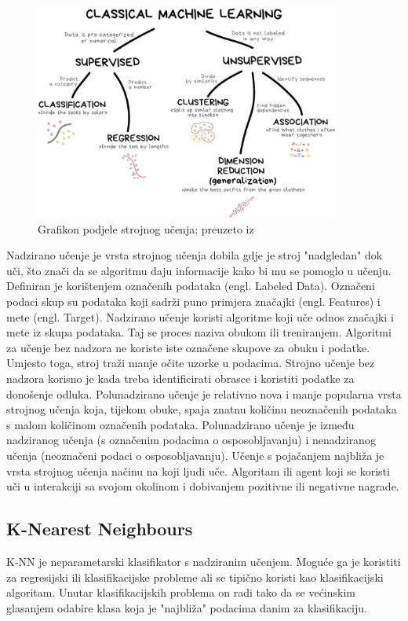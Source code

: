 \documentclass[]{foi}
\begin{document}
\begin{figure}[!h]
    \centering
    \includegraphics[width=0.9\textwidth]{slike/machine.jpg}
    \caption{Grafikon podjele strojnog učenja; preuzeto iz \cite{Machine}}
    \label{fig:machine-graf}
\end{figure}

Nadzirano učenje je vrsta strojnog učenja dobila gdje je stroj "nadgledan" dok uči, što znači da se algoritmu daju informacije kako bi mu se pomoglo u učenju. Definiran je korištenjem označenih podataka (engl. Labeled Data). Označeni podaci skup su podataka koji sadrži puno primjera značajki (engl. Features) i mete (engl. Target). Nadzirano učenje koristi algoritme koji uče odnos značajki i mete iz skupa podataka. Taj se proces naziva obukom ili treniranjem. \cite{Coursera2023}
Algoritmi za učenje bez nadzora ne koriste iste označene skupove za obuku i podatke. Umjesto toga, stroj traži manje očite uzorke u podacima. Strojno učenje bez nadzora korisno je kada treba identificirati obrasce i koristiti podatke za donošenje odluka. \cite{Coursera2023}
Polunadzirano učenje je relativno nova i manje popularna vrsta strojnog učenja koja, tijekom obuke, spaja znatnu količinu neoznačenih podataka s malom količinom označenih podataka. Polunadzirano učenje je između nadziranog učenja (s označenim podacima o osposobljavanju) i nenadziranog učenja (neoznačeni podaci o osposobljavanju). \cite{Datacamp}
Učenje s pojačanjem najbliža je vrsta strojnog učenja načinu na koji ljudi uče. Algoritam ili agent koji se koristi uči u interakciji sa svojom okolinom i dobivanjem pozitivne ili negativne nagrade. \cite{Coursera2023}

\subsection{K-Nearest Neighbours}
K-NN je neparametarski klasifikator s nadziranim učenjem. Moguće ga je koristiti za regresijski ili klasifikacijske probleme ali se tipično koristi kao klasifikacijski algoritam. Unutar klasifikacijskih problema on radi tako da se većinskim glasanjem odabire klasa koja je "najbliža" podacima danim za klasifikaciju. 
\end{document}
